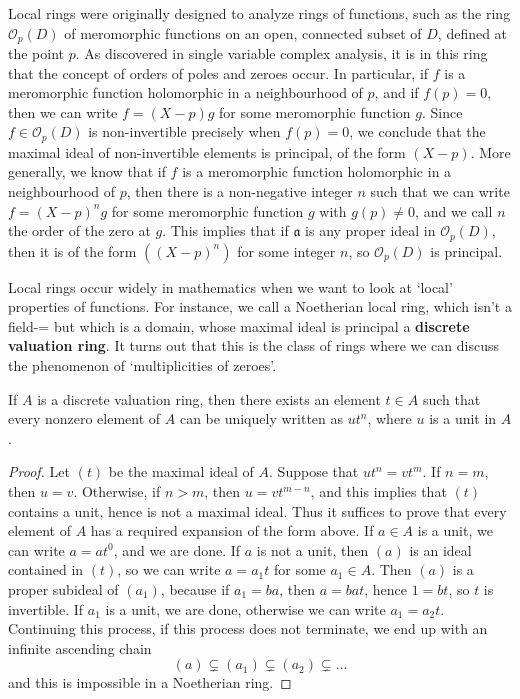 Local rings were originally designed to analyze rings of functions, such as the ring $\mathcal{O}_p(D)$ of meromorphic functions on an open, connected subset of $D$, defined at the point $p$. As discovered in single variable complex analysis, it is in this ring that the concept of orders of poles and zeroes occur. In particular, if $f$ is a meromorphic function holomorphic in a neighbourhood of $p$, and if $f(p) = 0$, then we can write $f = (X-p)g$ for some meromorphic function $g$. Since $f \in \mathcal{O}_p(D)$ is non-invertible precisely when $f(p) = 0$, we conclude that the maximal ideal of non-invertible elements is principal, of the form $(X-p)$. More generally, we know that if $f$ is a meromorphic function holomorphic in a neighbourhood of $p$, then there is a non-negative integer $n$ such that we can write $f = (X-p)^ng$ for some meromorphic function $g$ with $g(p) \neq 0$, and we call $n$ the order of the zero at $g$. This implies that if $\mathfrak{a}$ is any proper ideal in $\mathcal{O}_p(D)$, then it is of the form $((X - p)^n)$ for some integer $n$, so $\mathcal{O}_p(D)$ is principal.

Local rings occur widely in mathematics when we want to look at `local' properties of functions. For instance, we call a Noetherian local ring, which isn't a field-= but which is a domain, whose maximal ideal is principal a {\bf discrete valuation ring}. It turns out that this is the class of rings where we can discuss the phenomenon of `multiplicities of zeroes'.

\begin{prop}
    If $A$ is a discrete valuation ring, then there exists an element $t \in A$ such that every nonzero element of $A$ can be uniquely written as $ut^n$, where $u$ is a unit in $A$.
\end{prop}
\begin{proof}
    Let $(t)$ be the maximal ideal of $A$. Suppose that $ut^n = vt^m$. If $n = m$, then $u = v$. Otherwise, if $n > m$, then $u = vt^{m-n}$, and this implies that $(t)$ contains a unit, hence is not a maximal ideal. Thus it suffices to prove that every element of $A$ has a required expansion of the form above. If $a \in A$ is a unit, we can write $a = at^0$, and we are done. If $a$ is not a unit, then $(a)$ is an ideal contained in $(t)$, so we can write $a = a_1t$ for some $a_1 \in A$. Then $(a)$ is a proper subideal of $(a_1)$, because if $a_1 = ba$, then $a = bat$, hence $1 = bt$, so $t$ is invertible. If $a_1$ is a unit, we are done, otherwise we can write $a_1 = a_2t$. Continuing this process, if this process does not terminate, we end up with an infinite ascending chain
    \[ (a) \subsetneq (a_1) \subsetneq (a_2) \subsetneq \dots \]
    and this is impossible in a Noetherian ring.
\end{proof}

